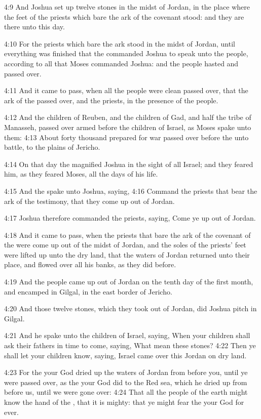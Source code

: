 4:9 And Joshua set up twelve stones in the midst of Jordan, in the
place where the feet of the priests which bare the ark of the covenant
stood: and they are there unto this day.

4:10 For the priests which bare the ark stood in the midst of Jordan,
until everything was finished that the \LORD commanded Joshua to speak
unto the people, according to all that Moses commanded Joshua: and the
people hasted and passed over.

4:11 And it came to pass, when all the people were clean passed over,
that the ark of the \LORD passed over, and the priests, in the presence
of the people.

4:12 And the children of Reuben, and the children of Gad, and half the
tribe of Manasseh, passed over armed before the children of Israel, as
Moses spake unto them: 4:13 About forty thousand prepared for war
passed over before the \LORD unto battle, to the plains of Jericho.

4:14 On that day the \LORD magnified Joshua in the sight of all Israel;
and they feared him, as they feared Moses, all the days of his life.

4:15 And the \LORD spake unto Joshua, saying, 4:16 Command the priests
that bear the ark of the testimony, that they come up out of Jordan.

4:17 Joshua therefore commanded the priests, saying, Come ye up out of
Jordan.

4:18 And it came to pass, when the priests that bare the ark of the
covenant of the \LORD were come up out of the midst of Jordan, and the
soles of the priests' feet were lifted up unto the dry land, that the
waters of Jordan returned unto their place, and flowed over all his
banks, as they did before.

4:19 And the people came up out of Jordan on the tenth day of the
first month, and encamped in Gilgal, in the east border of Jericho.

4:20 And those twelve stones, which they took out of Jordan, did
Joshua pitch in Gilgal.

4:21 And he spake unto the children of Israel, saying, When your
children shall ask their fathers in time to come, saying, What mean
these stones?  4:22 Then ye shall let your children know, saying,
Israel came over this Jordan on dry land.

4:23 For the \LORD your God dried up the waters of Jordan from before
you, until ye were passed over, as the \LORD your God did to the Red
sea, which he dried up from before us, until we were gone over: 4:24
That all the people of the earth might know the hand of the \LORD, that
it is mighty: that ye might fear the \LORD your God for ever.

